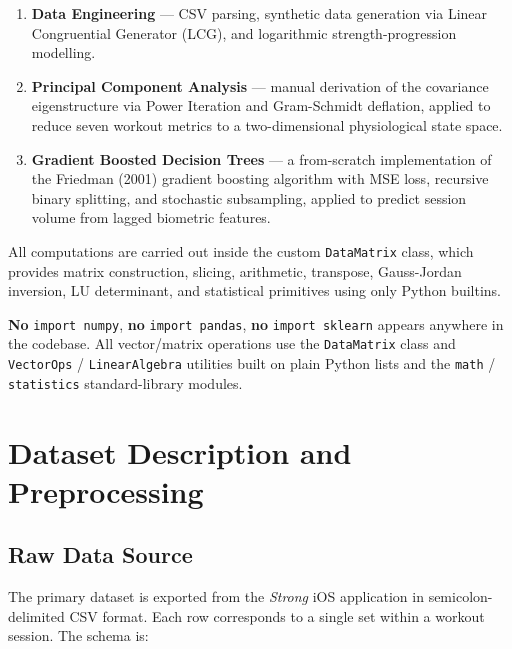 \documentclass[12pt,a4paper]{report}
\theoremstyle{definition}
\begin{document}
\begin{enumerate}
  \item \textbf{Data Engineering} — CSV parsing, synthetic data generation via
        Linear Congruential Generator (LCG), and logarithmic strength-progression
        modelling.
  \item \textbf{Principal Component Analysis} — manual derivation of the covariance
        eigenstructure via Power Iteration and Gram-Schmidt deflation, applied to
        reduce seven workout metrics to a two-dimensional physiological state space.
  \item \textbf{Gradient Boosted Decision Trees} — a from-scratch implementation
        of the Friedman (2001) gradient boosting algorithm with MSE loss, recursive
        binary splitting, and stochastic subsampling, applied to predict session
        volume from lagged biometric features.
\end{enumerate}

All computations are carried out inside the custom \texttt{DataMatrix} class,
which provides matrix construction, slicing, arithmetic, transpose, Gauss-Jordan
inversion, LU determinant, and statistical primitives using only Python builtins.

\bigskip
\begin{infobox}
  \textbf{No} \texttt{import numpy}, \textbf{no} \texttt{import pandas},
  \textbf{no} \texttt{import sklearn} appears anywhere in the codebase.
  All vector/matrix operations use the \texttt{DataMatrix} class and
  \texttt{VectorOps} / \texttt{LinearAlgebra} utilities built on plain
  Python lists and the \texttt{math} / \texttt{statistics} standard-library modules.
\end{infobox}

\chapter{Dataset Description and Preprocessing}

\section{Raw Data Source}

The primary dataset is exported from the \textit{Strong} iOS application in
semicolon-delimited CSV format. Each row corresponds to a single set within
a workout session. The schema is:
\end{document}
